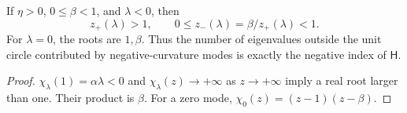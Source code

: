 \begin{proposition}
If $\eta>0$, $0\leq\beta<1$, and $\lambda<0$, then
\begin{equation}
z_+(\lambda)>1,\qquad
0\leq z_-(\lambda)=\beta/z_+(\lambda)<1 .
\end{equation}
For $\lambda=0$, the roots are $1,\beta$.
Thus the number of eigenvalues outside the unit circle contributed
by negative-curvature modes is exactly the negative index of
$\mathsf H$.
\end{proposition}
\begin{proof}
$\chi_\lambda(1)=\alpha\lambda<0$ and
$\chi_\lambda(z)\to+\infty$ as $z\to+\infty$ imply a real root
larger than one. Their product is $\beta$.
For a zero mode,
$\chi_0(z)=(z-1)(z-\beta)$.
\end{proof}


